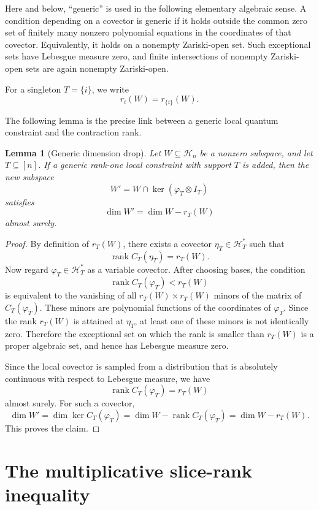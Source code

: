 \documentclass[11pt]{article}
\newtheorem{lemma}{Lemma}
\DeclareMathOperator{\rank}{rank}
\begin{document}
Here and below, ``generic'' is used in the following elementary algebraic
sense.  A condition depending on a covector is generic if it holds outside the
common zero set of finitely many nonzero polynomial equations in the
coordinates of that covector.  Equivalently, it holds on a nonempty
Zariski-open set.  Such exceptional sets have Lebesgue measure zero, and finite
intersections of nonempty Zariski-open sets are again nonempty Zariski-open.

For a singleton \(T=\{i\}\), we write
\[
r_i(W)=r_{\{i\}}(W).
\]

The following lemma is the precise link between a generic local quantum
constraint and the contraction rank.

\begin{lemma}[Generic dimension drop]
	\label{lem:dimension-drop}
	Let \(W\subseteq\mathcal H_n\) be a nonzero subspace, and let \(T\subseteq[n]\).
	If a generic rank-one local constraint with support \(T\) is added, then the
	new subspace
	\[
	W'
	=
	W\cap\ker(\varphi_T\otimes I_{\bar T})
	\]
	satisfies
	\[
	\dim W'=\dim W-r_T(W)
	\]
	almost surely.
\end{lemma}

\begin{proof}
	By definition of \(r_T(W)\), there exists a covector
	\(\eta_T\in\mathcal H_T^*\) such that
	\[
	\rank C_T(\eta_T)=r_T(W).
	\]
	Now regard \(\varphi_T\in\mathcal H_T^*\) as a variable covector.  After
	choosing bases, the condition
	\[
	\rank C_T(\varphi_T)<r_T(W)
	\]
	is equivalent to the vanishing of all \(r_T(W)\times r_T(W)\) minors of the
	matrix of \(C_T(\varphi_T)\).  These minors are polynomial functions of the
	coordinates of \(\varphi_T\).  Since the rank \(r_T(W)\) is attained at
	\(\eta_T\), at least one of these minors is not identically zero.  Therefore
	the exceptional set on which the rank is smaller than \(r_T(W)\) is a proper
	algebraic set, and hence has Lebesgue measure zero.
	
	Since the local covector is sampled from a distribution that is absolutely
	continuous with respect to Lebesgue measure, we have
	\[
	\rank C_T(\varphi_T)=r_T(W)
	\]
	almost surely.  For such a covector,
	\[
	\dim W'
	=
	\dim\ker C_T(\varphi_T)
	=
	\dim W-\rank C_T(\varphi_T)
	=
	\dim W-r_T(W).
	\]
	This proves the claim.
\end{proof}


\section{The multiplicative slice-rank inequality}
\label{sec:slice-rank}
\end{document}
